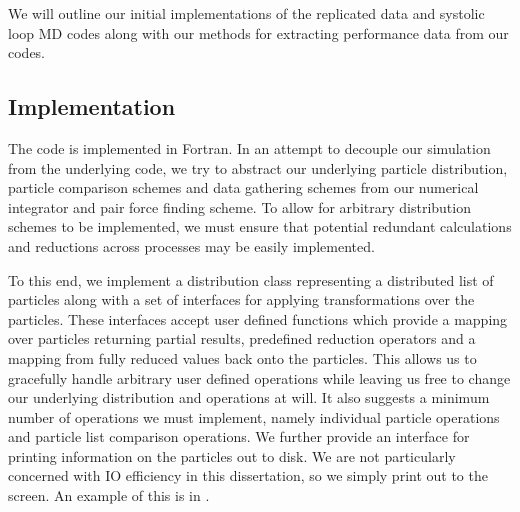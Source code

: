 We will outline our initial implementations of
the replicated data and systolic loop MD codes
along with our methods for extracting performance data from our codes.

\subsection{Implementation}

The code is implemented in Fortran.
%
In an attempt to decouple our simulation from the underlying code,
we try to abstract our underlying
particle distribution,
particle comparison schemes and
data gathering schemes
from our numerical integrator and pair force finding scheme.
%
To allow for arbitrary distribution schemes to be implemented,
we must ensure that potential redundant calculations and reductions
across processes may be easily implemented.

To this end, we implement a distribution class
representing a distributed list of particles
along with a set of interfaces for applying transformations over the particles.
%
These interfaces accept user defined functions which provide
a mapping over particles returning partial results,
predefined reduction operators and
a mapping from fully reduced values back onto the particles.
%
This allows us to gracefully handle arbitrary user defined operations while
leaving us free to change our underlying distribution and operations
at will.
%
It also suggests a minimum number of operations we must implement,
namely individual particle operations and particle list comparison
operations.
%
We further provide an interface for printing information on the particles
out to disk.
%
We are not particularly concerned with IO efficiency in this dissertation,
so we simply print out to the screen.
%
An example of this is in .

